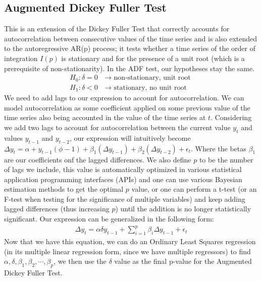 \documentclass{article}
\begin{document}
\begin{spacing}{2.0}
\subsection{Augmented Dickey Fuller Test}

This is an extension of the Dickey Fuller Test that correctly accounts for autocorrelation between consecutive values of the time series and is also extended to the autoregressive
AR(p) process; it tests whether a time series of the order of integration $I(p)$ is stationary and for the presence of a unit root (which is a prerequisite of non-stationarity).
In the ADF test, our hypotheses stay the same.
\begin{gather*}
    H_{0} : \delta = 0 \text{ $\rightarrow$ non-stationary, unit root} \\
    H_{1} : \delta < 0 \text{ $\rightarrow$ stationary, no unit root}
\end{gather*}
We need to add lags to our expression to account for autocorrelation. We can model autocorrelation as some coefficient applied on some previous value of the time series also being
accounted in the value of the time series at $t$. Considering we add two lags to account for autocorrelation between the current value $y_{t}$ and values $y_{t - 1}$ and $y_{t - 2}$,
our expression will intuitively become $\Delta y_{t} = \alpha + y_{t - 1} (\phi - 1) + \beta_{1}(\Delta y_{t - 1}) + \beta_{2}(\Delta y_{t - 2}) + \epsilon_{t}$. Where the betas $\beta_{1}$
are our coefficients onf the lagged differences. We also define $p$ to be the number of lags we include, this value is automatically optimized in various statistical application
programming interfaces (APIs) and one can use various Bayesian estimation methods to get the optimal $p$ value, or one can perform a t-test (or an F-test when testing for the significance
of multiple variables) and keep adding lagged differences (thus increasing $p$) until the addition is no longer statistically significant. Our expression can be generalized in the
following form:
\begin{gather*}
    \Delta y_{t} = \alpha \delta y_{t - 1} + \sum_{i = 1}^{p} \beta_{i} \Delta y_{t - 1} + \epsilon_{t}
\end{gather*}
Now that we have this equation, we can do an Ordinary Least Squares regression (in its multiple linear regression form, since we have multiple regressors) to find
$\alpha, \delta, \beta_{1}, \beta_{2}, \cdots, \beta_{p}$, we then use the $\delta$ value as the final p-value for the Augmented Dickey Fuller Test.

















\end{spacing}
\end{document}
